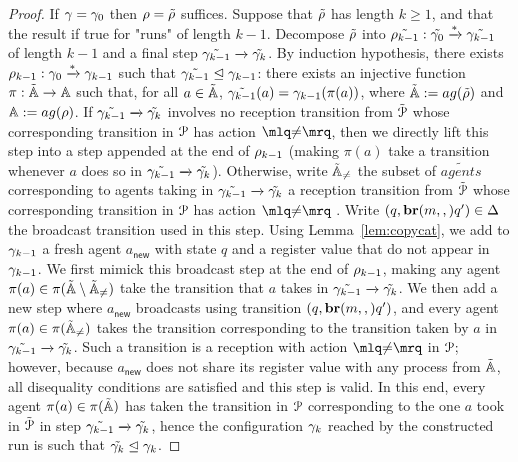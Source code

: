 \begin{proof}
	If $\gamma = \gamma_0$ then $\rho = \tilde{\rho}$ suffices. Suppose that $\tilde{\rho}$ has length $k \geq 1$, and that the result if true for "runs" of length $k-1$. Decompose $\tilde{\rho}$ into $\tilde{\rho_{k-1}}: \tilde{\gamma_0} \xrightarrow{*} \tilde{\gamma_{k-1}}$ of length $k-1$ and a final step $\tilde{\gamma_{k-1}} \xrightarrow{} \tilde{\gamma_k}$. 
	By induction hypothesis, there exists $\rho_{k-1}: \gamma_0 \xrightarrow{*} \gamma_{k-1}$ such that $\tilde{\gamma_{k-1}} \trianglelefteq \gamma_{k-1}$: there exists an injective function $\pi : \tilde{\mathbb{A}} \rightarrow \mathbb{A}$
	such that, for all $a \in \tilde{\mathbb{A}}$, $\tilde{\gamma_{k-1}}(a) = \gamma_{k-1}(\pi(a))$, where $\tilde{\agents} := \agentsof{\tilde{\run}}$ and $\agents := \agentsof{\run}$. If $\tilde{\gamma_{k-1}} \xrightarrow{} \tilde{\gamma_k}$ involves no reception transition from $\tilde{\mathcal{P}}$ whose corresponding transition in $\mathcal{P}$ has action $\quotemarks{\diseqtestact}$, then we directly lift this step into a step appended at the end of $\rho_{k-1}$ (making $\pi(a)$ take a transition whenever $a$ does so in $\tilde{\gamma_{k-1}} \xrightarrow{} \tilde{\gamma_k}$). Otherwise, write $\tilde{\mathbb{A}}_{{\ne}}$ the subset of $\tilde{agents}$ corresponding to agents taking in $\tilde{\gamma_{k-1}} \xrightarrow{} \tilde{\gamma_k}$ a reception transition from $\tilde{\mathcal{P}}$ whose corresponding transition in $\mathcal{P}$ has action $\quotemarks{\diseqtestact}$ . Write $(q, \textbf{br}(m, ,) q') \in \Delta$ the broadcast transition used in this step.  Using Lemma~\ref{lem:copycat}, we add to $\gamma_{k-1}$ a fresh agent $a_{\mathsf{new}}$ with state $q$ and a register value that do not appear in $\gamma_{k-1}$. 
	We first mimick this broadcast step at the end of $\rho_{k-1}$, making any agent $\pi(a) \in \pi(\tilde{\mathbb{A}} \setminus \tilde{\mathbb{A}}_{{\ne}})$ take the transition that $a$ takes in $\tilde{\gamma_{k-1}} \xrightarrow{} \tilde{\gamma_k}$. We then add a new step where $a_{\mathsf{new}}$ broadcasts using transition $(q, \textbf{br}(m, ,) q')$, and every agent $\pi(a) \in \pi(\tilde{\mathbb{A}}_{{\ne}})$ takes the transition corresponding to the transition taken by $a$ in $\tilde{\gamma_{k-1}} \xrightarrow{} \tilde{\gamma_k}$. Such a transition is a reception with action $\quotemarks{\diseqtestact}$ in $\mathcal{P}$; however, because $a_{\mathsf{new}}$ does not share its register value with any process from $\tilde{\mathbb{A}}$, all disequality conditions are satisfied and this step is valid. In this end, every agent $\pi(a) \in \pi(\tilde{\mathbb{A}})$ has taken the transition in $\mathcal{P}$ corresponding to the one $a$ took in $\tilde{\mathcal{P}}$ in step $\tilde{\gamma_{k-1}} \xrightarrow{} \tilde{\gamma_k}$, hence the configuration $\gamma_k$ reached by the constructed run is such that $\tilde{\gamma_k} \trianglelefteq \gamma_k$. 
\end{proof}
\fi

